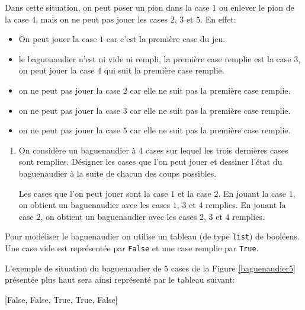     \medskip


\noindent Dans cette situation, on peut poser un pion dans la case $1$ ou enlever le pion de la case $4$, mais on ne peut pas jouer les cases $2$, $3$ et $5$. En effet:
\begin{itemize}
    \item On peut jouer la case $1$ car c'est la première case du jeu.
    \item le baguenaudier n'est ni vide ni rempli, la première case remplie est la case $3$, on peut jouer la case $4$ qui suit la première case remplie.
    \item on ne peut pas jouer la case $2$ car elle ne suit pas la première case remplie.
    \item on ne peut pas jouer la case $3$ car elle ne suit pas la première case remplie.
    \item on ne peut pas jouer la case $5$ car elle ne suit pas la première case remplie.   
\end{itemize}

\bigskip

\begin{enumerate}[resume]
\item On considère un baguenaudier à $4$ cases sur lequel les trois dernières cases sont remplies. Désigner les cases que l'on peut jouer et dessiner l'état du baguenaudier à la suite de chacun des coups possibles.

    \begin{blocvisible}[height=2]
        Les cases que l'on peut jouer sont la case $1$ et la case $2$. 
        En jouant la case $1$, on obtient un baguenaudier avec les cases $1$, $3$ et $4$ remplies. En jouant la case $2$, on obtient un baguenaudier avec les cases $2$, $3$ et $4$ remplies.
    \end{blocvisible}


\end{enumerate}

\medskip

 Pour modéliser le baguenaudier on utilise un tableau (de type \verb|list|) de booléens. Une case vide est représentée par \texttt{False} et une case remplie par \texttt{True}.



 L'exemple de situation du baguenaudier de $5$ cases de la Figure \ref{baguenaudier5} présentée plus haut sera ainsi représenté par le tableau suivant: 

    \begin{CodePythontexAlt}[TaillePolice=\large, Largeur=1\linewidth,Centre,Lignes=true,PremLigne=1]{}
[False, False, True, True, False]
\end{CodePythontexAlt}

